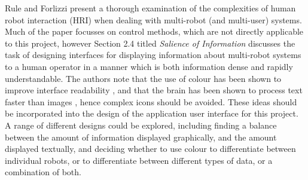 \documentclass[titlepage,hidelinks,10pt]{article}
\begin{document}
Rule and Forlizzi \cite{DesginingInterfaces} present a thorough examination of the complexities of human robot interaction (HRI) when dealing with multi-robot (and multi-user) systems. Much of the paper focusses on control methods, which are not directly applicable to this project, however Section 2.4 titled \textit{Salience of Information} discusses the task of designing interfaces for displaying information about multi-robot systems to a human operator in a manner which is both information dense and rapidly understandable. The authors note that the use of colour has been shown to improve interface readability \cite{InterfaceColour}, and that the brain has been shown to process text faster than images \cite{InterfaceText}, hence complex icons should be avoided. These ideas should be incorporated into the design of the application user interface for this project. A range of different designs could be explored, including finding a balance between the amount of information displayed graphically, and the amount displayed textually, and deciding whether to use colour to differentiate between individual robots, or to differentiate between different types of data, or a combination of both.
\end{document}
